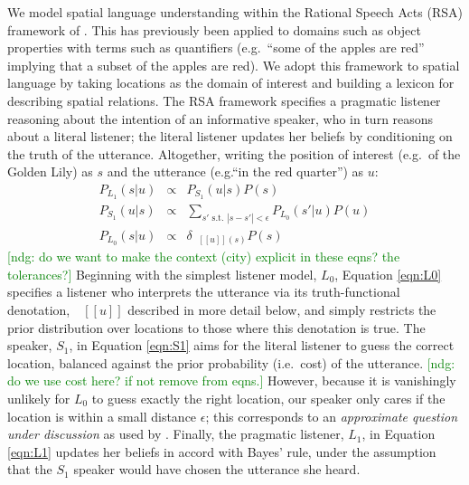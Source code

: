 \documentclass[10pt,letterpaper]{article}
\newcommand{\denote}[1]{\mbox{ $[\![ #1 ]\!]$}}
\newcommand{\ndg}[1]{\textcolor{Green}{[ndg: #1]}}
\begin{document}
We model spatial language understanding within the Rational Speech Acts (RSA) framework of .
This has previously been applied to domains such as object properties with terms such as quantifiers (e.g.~``some of the apples are red'' implying that a subset of the apples are red).
We adopt this framework to spatial language by taking locations as the domain of interest and building a lexicon for describing spatial relations. 
The RSA framework specifies a pragmatic listener reasoning about the intention of an informative speaker, who in turn reasons about a literal listener; the literal listener updates her beliefs by conditioning on the truth of the utterance.
Altogether, writing the position of interest (e.g.~of the Golden Lily) as $s$ and the utterance (e.g.``in the red quarter'') as $u$:
\begin{eqnarray}
P_{L_1}(s|u)&\propto&P_{S_1}(u | s) P(s) \label{eqn:L1}\\
P_{S_1}(u|s)&\propto&\sum_{s' \text{ s.t. } |s-s'|<\epsilon} P_{L_0}(s'|u) P(u)\label{eqn:S1}\\
P_{L_0}(s|u)&\propto& \delta_{\denote{u}(s)} P(s)\label{eqn:L0}
\end{eqnarray}
\ndg{do we want to make the context (city) explicit in these eqns? the tolerances?}
Beginning with the simplest listener model, $L_0$, Equation \ref{eqn:L0} specifies a listener who interprets the utterance via its truth-functional denotation, $\denote{u}$ described in more detail below, and simply restricts the prior distribution over locations to those where this denotation is true.
The speaker, $S_1$, in Equation \ref{eqn:S1} aims for the literal listener to guess the correct location, balanced against the prior probability (i.e.~cost) of the utterance. \ndg{do we use cost here? if not remove from eqns.}
However, because it is vanishingly unlikely for $L_0$ to guess exactly the right location, our speaker only cares if the location is within a small distance $\epsilon$; this corresponds to an \emph{approximate question under discussion} as used by .
Finally, the pragmatic listener, $L_1$, in Equation \ref{eqn:L1} updates her beliefs in accord with Bayes' rule, under the assumption that the $S_1$ speaker would have chosen the utterance she heard.
\end{document}
